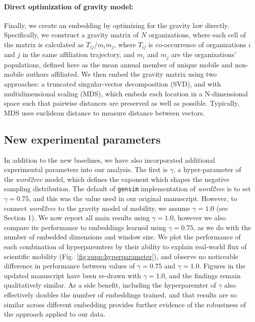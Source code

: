 \documentclass[12pt,a4paper]{article}
\begin{document}
\vspace{-0.3cm}
\paragraph{Direct optimization of gravity model:} Finally, we create an embedding by optimizing for the gravity law directly.
Specifically, we construct a gravity matrix of $N$ organizations, where each cell of the matrix is calculated as $T_{ij}/m_i m_j$, where $T_{ij}$ is co-occurrence of organizations $i$ and $j$ in the same affiliation trajectory, and $m_i$ and $m_j$ are the organizations' populations, defined here as the mean annual member of unique mobile and non-mobile authors affiliated. We then embed the gravity matrix using two approaches: a truncated singular-vector decomposition (SVD), and with multidimensional scaling (MDS), which embeds each location in a N-dimensional space such that pairwise distances are preserved as well as possible.
Typically, MDS uses euclidean distance to measure distance between vectors.

\subsection{New experimental parameters}
In addition to the new baselines, we have also incorporated additional experimental parameters into our analysis.
The first is $\gamma$, a hyper-parameter of the \textit{word2vec} model, which defines the exponent which shapes the negative sampling distribution.
The default of \texttt{gensim} implementation of \textit{word2vec} is to set $\gamma = 0.75$, and this was the value used in our original manuscript.
However, to connect \textit{word2vec} to the gravity model of mobility, we assume $\gamma = 1.0$ (see Section 1).
We now report all main results using $\gamma = 1.0$, however we also compare its performance to embeddings learned using $\gamma = 0.75$, as we do with the number of embedded dimensions and window size.
We plot the performance of each combination of hyperparemters by their ability to explain real-world flux of scientific mobility (Fig.~\ref{fig:supp:hyperparameter}), and observe no noticeable difference in performance between values of $\gamma = 0.75$ and $\gamma = 1.0$.
Figures in the updated manuscript have been re-drawn with $\gamma = 1.0$, and the findings remain qualitatively similar.
As a side benefit, including the hyperparemter of $\gamma$ also effectively doubles the number of embeddings trained, and that results are so similar across different embedding provides further evidence of the robustness of the approach applied to our data.
\end{document}
